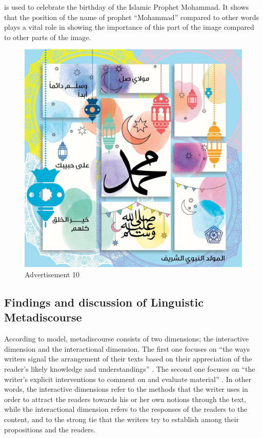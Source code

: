 \documentclass[english]{textolivre}
\begin{document}
 is used to celebrate the birthday of the Islamic Prophet Mohammad. It shows that the position of the name of prophet “Mohammad” compared to other words plays a vital role in showing the importance of this part of the image compared to other parts of the image.

\begin{figure}[htbp]
\centering
\begin{minipage}{0.5\textwidth}
\includegraphics[width=\linewidth]{Fig10.png}
\caption{Advertisement 10}
\label{fig10}
\end{minipage}
\end{figure}

\subsection{Findings and discussion of Linguistic Metadiscourse}\label{sec-outras-estr}
According to  model, metadiscourse consists of two dimensions; the interactive dimension and the interactional dimension. The first one focuses on “the ways writers signal the arrangement of their texts based on their appreciation of the reader’s likely knowledge and understandings” \cite[p.~43]{hyland_metadiscourse:_2005}. The second one focuses on “the writer’s explicit interventions to comment on and evaluate material” \cite[p.~44]{hyland_metadiscourse:_2005}. In other words, the interactive dimensions refer to the methods that the writer uses in order to attract the readers towards his or her own notions through the text, while the interactional dimension refers to the responses of the readers to the content, and to the strong tie that the writers try to establish among their propositions and the readers.
\end{document}
